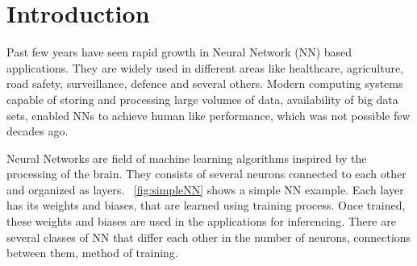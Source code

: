 \documentclass[a4paper,10pt]{article}
\begin{document}

\newpage
\setcounter{tocdepth}{2}
\tableofcontents
\newpage

\section{Introduction}

Past few years have seen rapid growth in Neural Network (NN) based applications. They are widely used in different areas like healthcare, agriculture, road safety, surveillance, defence and several others. Modern computing systems capable of storing and processing large volumes of data, availability of big data sets, enabled NNs to achieve human like performance, which was not possible few decades ago. 

Neural Networks are field of machine learning algorithms inspired by the processing of the brain. They consists of several neurons connected to each other and organized as layers. \figurename{~\ref{fig:simpleNN}} shows a simple NN example. Each layer has its weights and biases, that are learned using training process. Once trained, these weights and biases are used in the applications for inferencing. There are several classes of NN that differ each other in the number of neurons, connections between them, method of training. 
%
\end{document}
